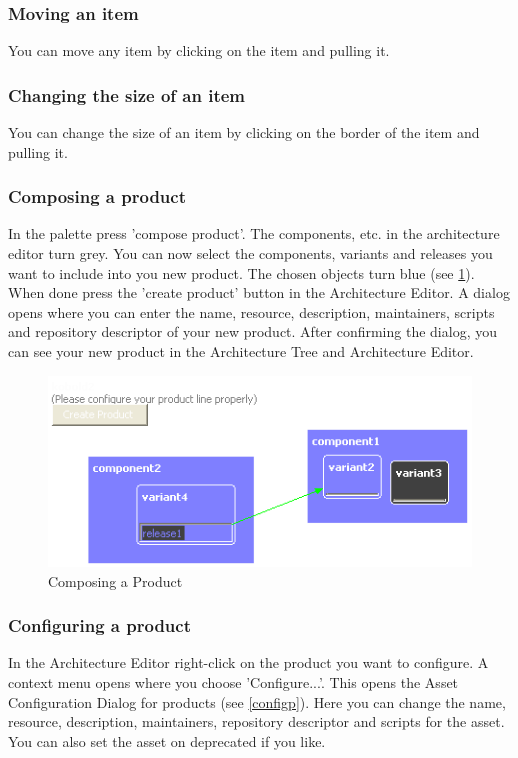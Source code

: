 \subsubsection{Moving an item}
You can move any item by clicking on the item and pulling it.

\subsubsection{Changing the size of an item}
You can change the size of an item by clicking on the border of the item and pulling it.


\subsubsection{Composing a product}

In the palette press 'compose product'. The components, etc. in the architecture editor turn
grey. You can now select the components, variants and releases you want to include into
you new product. The chosen objects turn blue (see \ref{compose}). When done press the 
'create product' button in the Architecture Editor. A dialog opens where you can enter
the name, resource, description, maintainers, scripts and repository descriptor of your new product. After confirming the dialog, you can see
your new product in the Architecture Tree and Architecture Editor.

\begin{figure}[h!]
\begin{center}
\includegraphics[width=12cm]{composeproduct.png}
   \caption{Composing a Product}
\label{compose}
\end{center}
\end{figure}\par

\subsubsection{Configuring a product}
In the Architecture Editor right-click on the product you want to configure. 
A context menu opens where you choose 'Configure...'. This opens the Asset Configuration Dialog
for products (see \ref{configp}). Here you can change the name, resource, description, maintainers, repository descriptor and scripts for the
asset. You can also set the asset on deprecated if you like.

